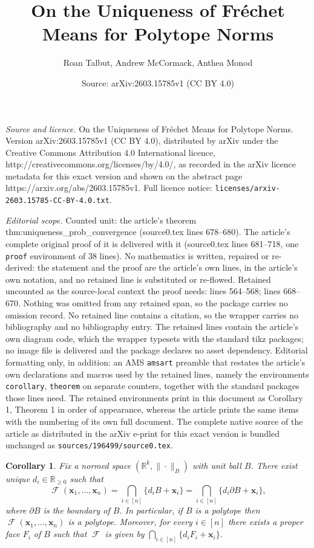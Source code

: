 \documentclass[10pt,a4paper]{amsart}
\title{On the Uniqueness of Fr\'echet Means for Polytope Norms}
\author{Roan Talbut, Andrew McCormack, Anthea Monod}
\date{Source: arXiv:2603.15785v1 (CC BY 4.0)}
\newtheorem{corollary}{Corollary}
\DeclareMathOperator{\FMset}{\mathcal{F}}
\newcommand{\R}{\mathbb{R}}
\renewcommand{\vec}[1]{\mathbf{#1}}
\begin{document}
\maketitle

\noindent\emph{Source and licence.} On the Uniqueness of Fr\'echet Means for Polytope Norms. Version arXiv:2603.15785v1 (CC BY 4.0), distributed by arXiv under the Creative Commons Attribution 4.0 International licence, http://creativecommons.org/licenses/by/4.0/, as recorded in the arXiv licence metadata for this exact version and shown on the abstract page https://arxiv.org/abs/2603.15785v1. Full licence notice: \texttt{licenses/arxiv-2603.15785-CC-BY-4.0.txt}.\par\smallskip

\noindent\textit{Editorial scope.} Counted unit: the article's theorem thm:uniqueness\_prob\_convergence (source0.tex lines 678--680). The article's complete original proof of it is delivered with it (source0.tex lines 681--718, one \texttt{proof} environment of 38 lines). No mathematics is written, repaired or re-derived: the statement and the proof are the article's own lines, in the article's own notation, and no retained line is substituted or re-flowed.  Retained uncounted as the source-local context the proof needs: lines 564--568; lines 668--670.  Nothing was omitted from any retained span, so the package carries no omission record.  No retained line contains a citation, so the wrapper carries no bibliography and no bibliography entry.  The retained lines contain the article's own diagram code, which the wrapper typesets with the standard tikz packages; no image file is delivered and the package declares no asset dependency.  Editorial formatting only, in addition: an AMS \texttt{amsart} preamble that restates the article's own declarations and macros used by the retained lines, namely the environments \texttt{corollary}, \texttt{theorem} on separate counters, together with the standard packages those lines need.  The retained environments print in this document as Corollary 1, Theorem 1 in order of appearance, whereas the article prints the same items with the numbering of its own full document.  The complete native source of the article as distributed in the arXiv e-print for this exact version is bundled unchanged as \texttt{sources/196499/source0.tex}.
	\begin{corollary}
		\label{cor:FMisPolytope}
		Fix a normed space $(\R^k, \| \cdot \|_B)$ with unit ball $B$. There exist unique $d_i \in \R_{\geq 0}$ such that $$\FMset (\vec x_1,\ldots,\vec x_n) = \bigcap_{i \in [n]}\{d_iB + \vec x_i\} = \bigcap_{i \in [n]}\{d_i\partial B + \vec x_i\},
		$$ where $\partial B$ is the boundary of $B$. In particular, if $B$ is a polytope then $\FMset(\vec x_1, \dots, \vec x_n)$ is a polytope. Moreover, for every $i \in [n]$ there exists a proper face $F_i$ of $B$ such that $\FMset$ is given by $\bigcap_{i \in [n]}\{d_iF_i + \vec x_i\}$. 
	\end{corollary}
\end{document}
